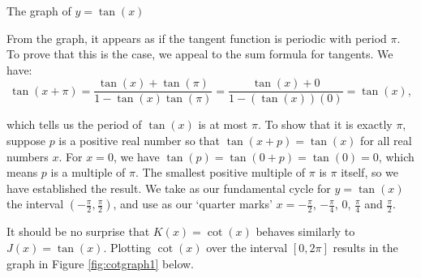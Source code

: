 \bigskip

\noindent\begin{minipage}{\textwidth}
\begin{center}
\end{center}
\captionsetup{type=figure}
\caption{The graph of $y = \tan(x)$}\label{fig:tangraph2}
\end{minipage}

\medskip

From the graph, it appears as if the tangent function is periodic with period $\pi$.  To prove that this is the case, we appeal to the sum formula for tangents.  We have: \[ \tan(x+\pi) = \dfrac{\tan(x) + \tan(\pi)}{1 - \tan(x) \tan(\pi)} = \dfrac{\tan(x) + 0}{1 - (\tan(x) )(0)} = \tan(x),\]

which tells us the period of $\tan(x)$ is at most $\pi$.  To show that it is exactly $\pi$, suppose $p$ is a positive real number so that $\tan(x+p) = \tan(x)$ for all real numbers $x$.  For $x=0$, we have $\tan(p) = \tan(0+p) = \tan(0) = 0$, which means $p$ is a multiple of $\pi$.  The smallest positive multiple of $\pi$ is $\pi$ itself, so we have established the result.   We take as our fundamental cycle for $y=\tan(x)$ the interval $\left(-\frac{\pi}{2}, \frac{\pi}{2}\right)$, and use as our `quarter marks' $x = -\frac{\pi}{2}$, $-\frac{\pi}{4}$, $0$, $\frac{\pi}{4}$ and $\frac{\pi}{2}$. 

\smallskip

It should be no surprise that $K(x) = \cot(x)$ behaves similarly to $J(x) = \tan(x)$. Plotting $\cot(x)$ over the interval $[0,2\pi]$ results in the graph in Figure \ref{fig:cotgraph1} below. 


\medskip

